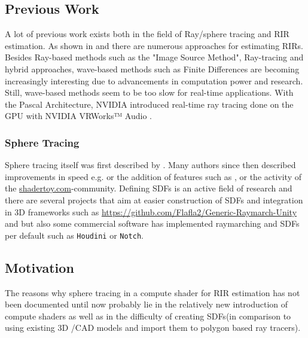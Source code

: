 \documentclass[twoside,a4paper]{article}
\begin{document}
\subsection{Previous Work}
\label{ssec:prev}
A lot of previous work exists both in the field of Ray/sphere tracing and RIR estimation.
As shown in \cite{alpkocak_computing_2010} and \cite{brinkmann_round_2019} there are numerous approaches for estimating RIRs. Besides Ray-based methods such as the "Image Source Method", Ray-tracing and hybrid approaches, wave-based methods such as Finite Differences are becoming increasingly interesting due to advancements in computation power and research. Still, wave-based methods seem to be too slow for real-time applications. With the Pascal Architecture, NVIDIA introduced real-time ray tracing done on the GPU with NVIDIA VRWorks™ Audio \cite{noauthor_vrworks_nodate}.






\subsubsection*{Sphere Tracing}
Sphere tracing itself was first described by \cite{hart_sphere_1996}. Many authors since then described improvements in speed e.g. \cite{balint_accelerating_2018} or the addition of features such as \cite{quilez_inigo_nodate}, \cite{keinert_enhanced_2014} or the activity of the \href{www.shadertoy.com}{shadertoy.com}-community.
Defining SDFs is an active field of research and there are several projects that aim at easier construction of SDFs and integration in 3D frameworks such as \href{https://github.com/Flafla2/Generic-Raymarch-Unity}{https://github.com/Flafla2/Generic-Raymarch-Unity} and \cite{lechner_hrtlacektdraymarchtoolkit_2020} but also some commercial software has implemented raymarching and SDFs per default such as \texttt{Houdini} or \texttt{Notch}.



\subsection{Motivation}
\label{subs:mot}
The reasons why sphere tracing in a compute shader for RIR estimation has not been documented until now probably lie in the relatively new introduction of compute shaders as well as in the difficulty of creating SDFs(in comparison to using existing 3D /CAD models and import them to polygon based ray tracers).
\end{document}
